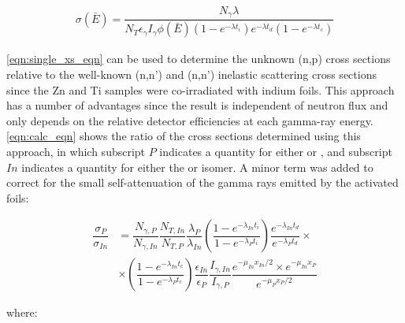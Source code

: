 \documentclass[5p]{elsarticle}
\newcommand{\pp}[1]{\left( #1\right)}
\begin{document}
\begin{align}\label{eqn:single_xs_eqn}
\sigma\pp{\bar{E}} = \dfrac{N_{\gamma}\lambda}{N_T \epsilon_\gamma I_\gamma  \phi\pp{\bar{E}}  \pp{1 - e^{-\lambda t_i}} e^{-\lambda t_d} \pp{1 - e^{-\lambda t_c}}}
\end{align}


\autoref{eqn:single_xs_eqn} can be used to determine the unknown (n,p) cross sections relative to the well-known (n,n') and (n,n') inelastic scattering cross sections since the Zn and Ti samples were co-irradiated with indium foils.
This approach has a number of advantages since the result is independent of neutron flux and only depends on the relative detector efficiencies at each gamma-ray energy.
 \autoref{eqn:calc_eqn} shows the ratio of the cross sections determined using this approach, in which subscript $P$ indicates a quantity for either  or , and subscript $In$ indicates a quantity for either the  or  isomer.
A minor term was added to correct for the small self-attenuation of the gamma rays emitted by the activated foils:



\begin{align}\label{eqn:calc_eqn}
\dfrac{\sigma_P}{\sigma_{In}} &=  \dfrac{N_{\gamma,P}}{N_{\gamma,In}}  \dfrac{N_{T,In}}{N_{T,P}} \dfrac{\lambda_P}{\lambda_{In}} \pp{\dfrac{1 - e^{-\lambda_{In}t_i}}{1 - e^{-\lambda_{P}t_i}}} \dfrac{e^{-\lambda_{In}t_d}}{ e^{-\lambda_{P}t_d}} \times \\
&\times \pp{\dfrac{1 - e^{-\lambda_{In}t_c}}{1 - e^{-\lambda_{P}t_c}}} \dfrac{\epsilon_{In}}{\epsilon_P}  \dfrac{I_{\gamma,In}}{I_{\gamma,P}} \dfrac{e^{-\mu_{In}x_{In}/2}\times e^{-\mu_{In}x_{P}}}{e^{-\mu_{P}x_{P}/2}} \nonumber
\end{align}

where:
\end{document}
